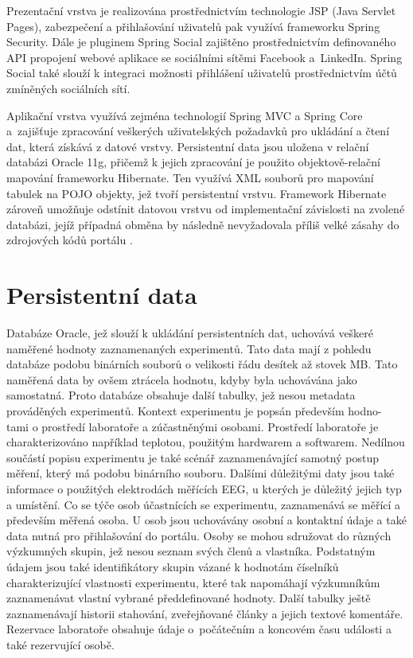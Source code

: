 \documentclass{projekt}
\begin{document}
Prezentační vrstva je realizována prostřednictvím technologie JSP (Java Servlet Pages), zabezpečení a přihlašování uživatelů pak využívá frameworku Spring Security. Dále je pluginem Spring Social zajištěno prostřednictvím definovaného API propojení webové aplikace se sociálními sítěmi Facebook a~LinkedIn. Spring Social také slouží k integraci možnosti přihlášení uživatelů prostřednictvím účtů zmíněných sociálních sítí.

Aplikační vrstva využívá zejména technologií Spring MVC a Spring Core a~zajišťuje zpracování veškerých uživatelských požadavků pro ukládání a čtení dat, která získává z datové vrstvy. Persistentní data jsou uložena v relační databázi Oracle 11g, přičemž k jejich zpracování je použito objektově-relační mapování frameworku Hibernate. Ten využívá XML souborů pro mapování tabulek na POJO objekty, jež tvoří persistentní vrstvu. Framework Hibernate zároveň umožňuje odstínit datovou vrstvu od implementační závislosti na zvolené databázi, jejíž případná obměna by následně nevyžadovala příliš velké zásahy do zdrojových kódů portálu \cite{_16}.


\section{Persistentní data}
\hspace{0.65cm}Databáze Oracle, jež slouží k ukládání persistentních dat, uchovává veškeré naměřené hodnoty zaznamenaných experimentů. Tato data mají z pohledu databáze podobu binárních souborů o velikosti řádu desítek až stovek MB. Tato naměřená data by ovšem ztrácela hodnotu, kdyby byla uchovávána jako samostatná. Proto databáze obsahuje další tabulky, jež nesou metadata prováděných experimentů. Kontext experimentu je popsán především hodno-\\tami o prostředí laboratoře a zúčastněnými osobami. Prostředí laboratoře je charakterizováno například teplotou, použitým hardwarem a softwarem. Nedílnou součástí popisu experimentu je také scénář zaznamenávající samotný postup měření, který má podobu binárního souboru. Dalšími důležitými daty jsou také informace o použitých elektrodách měřících EEG, u kterých je důležitý jejich typ a umístění. Co se týče osob účastnících se experimentu, zaznamenává se měřící a především měřená osoba. U osob jsou uchovávány osobní a kontaktní údaje a také data nutná pro přihlašování do portálu. Osoby se mohou sdružovat do různých výzkumných skupin, jež nesou seznam svých členů a vlastníka. Podstatným údajem jsou také identifikátory skupin vázané k hodnotám číselníků charakterizující vlastnosti experimentu, které tak napomáhají výzkumníkům zaznamenávat vlastní vybrané předdefinované hodnoty. Další tabulky ještě zaznamenávají historii stahování, zveřejňované články a jejich textové komentáře. Rezervace laboratoře obsahuje údaje o~počátečním a koncovém času události a také rezervující osobě. 
\end{document}
